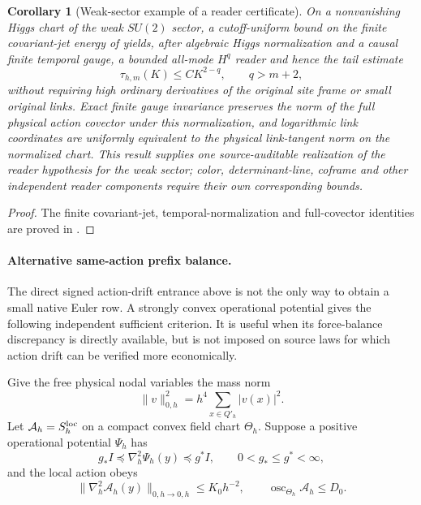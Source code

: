 \documentclass[11pt]{article}
\numberwithin{equation}{section}
\newtheorem{corollary}[corollary]{Corollary}
\theoremstyle{definition}
\theoremstyle{remark}
\newcommand{\norm}[1]{\lVert#1\rVert}
\begin{document}
\begin{corollary}[Weak-sector example of a reader certificate]
\label{cor:gauge-robust-reader}
On a nonvanishing Higgs chart of the weak $SU(2)$ sector, a cutoff-uniform bound on the finite covariant-jet energy of  yields, after algebraic Higgs normalization and a causal finite temporal gauge, a bounded all-mode $H^q$ reader and hence the tail estimate
\begin{equation}
 \tau_{h,m}(K)\le C K^{2-q},\qquad q>m+2,
 \label{eq:gauge-robust-tail}
\end{equation}
without requiring high ordinary derivatives of the original site frame or small original links.  Exact finite gauge invariance preserves the norm of the \emph{full} physical action covector under this normalization, and logarithmic link coordinates are uniformly equivalent to the physical link-tangent norm on the normalized chart.  This result supplies one source-auditable realization of the reader hypothesis for the weak sector; color, determinant-line, coframe and other independent reader components require their own corresponding bounds.
\end{corollary}
\begin{proof}
The finite covariant-jet, temporal-normalization and full-covector identities are proved in .
\end{proof}

\paragraph{Alternative same-action prefix balance.}
The direct signed action-drift entrance above is not the only way to obtain a small native Euler row.  A strongly convex operational potential gives the following independent sufficient criterion.  It is useful when its force-balance discrepancy is directly available, but is not imposed on source laws for which action drift can be verified more economically.

Give the free physical nodal variables the mass norm
\begin{equation}
 \norm v_{0,h}^2=h^4\sum_{x\in Q'_h}|v(x)|^2.
 \label{eq:prefix-mass}
\end{equation}
Let $\mathcal A_h=S_h^{\rm loc}$ on a compact convex field chart $\Theta_h$.  Suppose a positive operational potential $\Psi_h$ has
\begin{equation}
 g_*I\preceq \nabla_h^2\Psi_h(y)\preceq g^*I,
 \qquad 0<g_*\le g^*<\infty,
 \label{eq:prefix-Fisher}
\end{equation}
and the local action obeys
\begin{equation}
 \norm{\nabla_h^2\mathcal A_h(y)}_{0,h\to0,h}\le K_0h^{-2},
 \qquad \operatorname{osc}_{\Theta_h}\mathcal A_h\le D_0.
 \label{eq:prefix-Hessian}
\end{equation}
\end{document}
